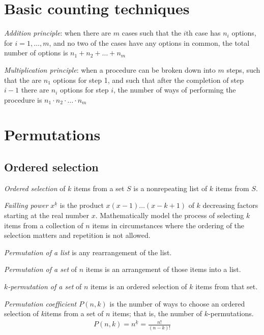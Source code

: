 \section{Basic counting techniques}

{\it Addition principle}: when there are $m$ cases such that the $i$th case has $n_{i}$ options, for $i=1,\ldots,m$, and no two of the cases have any options in common, the total number of options is $n_{1}+n_{2}+\ldots+n_{m}$

{\it Multiplication principle}: when a procedure can be broken down into $m$ steps, such that the are $n_{1}$ options for step 1, and such that after the completion of step $i-1$ there are $n_{i}$ options for step $i$, the number of ways of performing the procedure is $n_{1}\cdot n_{2}\cdot\ldots\cdot n_{m}$

\section{Permutations}

\subsection{Ordered selection}

{\it Ordered selection} of $k$ items from a set $S$ is a nonrepeating list of $k$ items from $S$.

{\it Failling power} $x^{\underline{k}}$ is the product $x(x-1)\ldots(x-k+1)$ of $k$ decreasing factors starting at the real number $x$. Mathematically model the process of selecting $k$ items from a collection of $n$ items in circumstances where the ordering of the selection matters and repetition is not allowed.

{\it Permutation of a list} is any rearrangement of the list.

{\it Permutation of a set} of $n$ items is an arrangement of those items into a list.

{\it $k$-permutation of a set} of $n$ items is an ordered selection of $k$ items from that set.

{\it Permutation coefficient $P(n,k)$} is the number of ways to choose an ordered selection of $k$items from a set of $n$ items; that is, the number of $k$-permutations.
\begin{eqnarray*}
    P(n,k)=n^{\underline{k}}=\frac{n!}{(n-k)!}
\end{eqnarray*}

